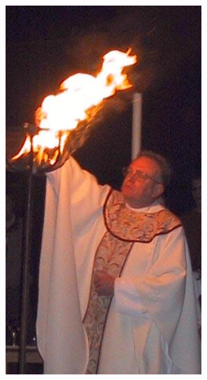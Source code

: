 \begin{figure}[h]
\begin{subfigure}[b]{0.18\textwidth}
         \includegraphics[width=\textwidth]{images/results/base/lighting_fire_x.png}
     \end{subfigure}
     \hfill
     \begin{subfigure}[b]{0.18\textwidth}
         \centering

\end{subfigure}
\end{figure}

